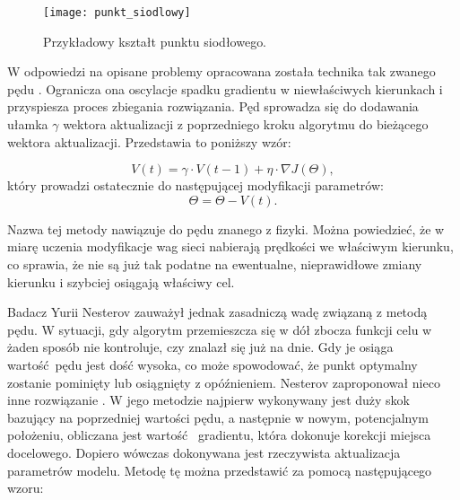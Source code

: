\begin{enumerate}
    \begin{figure}[!h]
      \centering
      \texttt{[image: punkt\_siodlowy]}
      \caption[Przykładowy kształt punktu siodłowego - źródło: \url{https://towardsdatascience.com}]{Przykładowy kształt punktu siodłowego.}
      \label{fig:punkt_siodlowy}
    \end{figure}

    W odpowiedzi na opisane problemy opracowana została technika tak zwanego
    pędu \cite{Momentum}. Ogranicza ona oscylacje spadku gradientu w niewłaściwych kierunkach i
    przyspiesza proces zbiegania rozwiązania. Pęd sprowadza się do dodawania ułamka
    $\gamma$ wektora aktualizacji z poprzedniego kroku algorytmu do bieżącego wektora
    aktualizacji. Przedstawia to poniższy wzór:

    \begin{equation}
    V(t)=\gamma \cdot V(t - 1) + \eta \cdot \nabla J(\Theta),
  \end{equation}
    który prowadzi ostatecznie do następującej modyfikacji parametrów:
    \begin{equation}
    \Theta = \Theta - V(t).
  \end{equation}

    Nazwa tej metody nawiązuje do pędu znanego z fizyki. Można powiedzieć, że
    w miarę uczenia modyfikacje wag sieci nabierają prędkości we właściwym kierunku, co
    sprawia, że nie są już tak podatne na ewentualne, nieprawidłowe zmiany kierunku i
    szybciej osiągają właściwy cel.

    Badacz Yurii Nesterov zauważył jednak zasadniczą wadę związaną z metodą pędu.
    W sytuacji, gdy algorytm przemieszcza się w dół zbocza funkcji celu w żaden
    sposób nie kontroluje, czy znalazł się już na dnie. Gdy je osiąga wartość pędu
    jest dość wysoka, co może spowodować, że punkt optymalny zostanie pominięty
    lub osiągnięty z opóźnieniem. Nesterov zaproponował nieco inne rozwiązanie \cite{Nesterov_momentum}.
    W jego metodzie najpierw wykonywany jest duży skok bazujący na poprzedniej
    wartości pędu, a następnie w nowym, potencjalnym położeniu, obliczana jest wartość 
    gradientu, która dokonuje korekcji miejsca docelowego. Dopiero wówczas dokonywana
    jest rzeczywista aktualizacja parametrów modelu. Metodę tę można przedstawić za
    pomocą następującego wzoru:


\end{enumerate}
